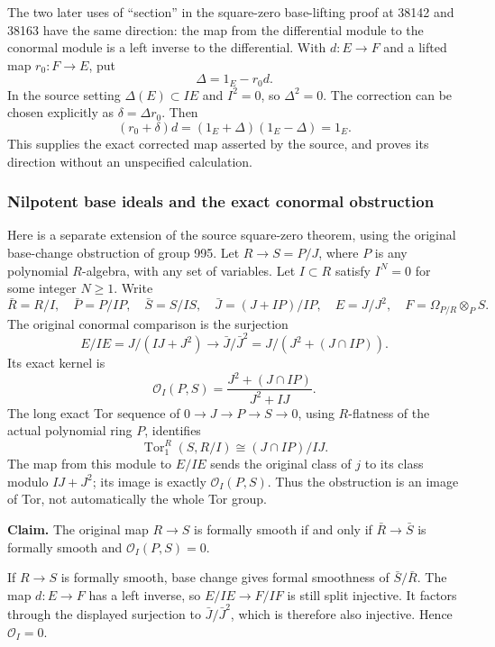 The two later uses of ``section'' in the square-zero base-lifting proof at 38142 and 38163 have the same direction: the map from the differential module to the conormal module is a left inverse to the differential. With \(d:E\to F\) and a lifted map \(r_0:F\to E\), put \[
\Delta=1_E-r_0d.
\] In the source setting \(\Delta(E)\subset IE\) and \(I^2=0\), so \(\Delta^2=0\). The correction can be chosen explicitly as \(\delta=\Delta r_0\). Then \[
(r_0+\delta)d=(1_E+\Delta)(1_E-\Delta)=1_E.
\] This supplies the exact corrected map asserted by the source, and proves its direction without an unspecified calculation.

\subsubsection{Nilpotent base ideals and the exact conormal obstruction}\label{nilpotent-base-ideals-and-the-exact-conormal-obstruction}

Here is a separate extension of the source square-zero theorem, using the original base-change obstruction of group 995. Let \(R\to S=P/J\), where \(P\) is any polynomial \(R\)-algebra, with any set of variables. Let \(I\subset R\) satisfy \(I^N=0\) for some integer \(N\ge1\). Write \[
\bar R=R/I,\quad \bar P=P/IP,\quad \bar S=S/IS,\quad
\bar J=(J+IP)/IP,\quad E=J/J^2,\quad F=\Omega_{P/R}\otimes_PS.
\] The original conormal comparison is the surjection \[
E/IE=J/(IJ+J^2)\longrightarrow
\bar J/\bar J^2=J/(J^2+(J\cap IP)).
\] Its exact kernel is \[
\mathcal O_I(P,S)=\frac{J^2+(J\cap IP)}{J^2+IJ}.
\] The long exact Tor sequence of \(0\to J\to P\to S\to0\), using \(R\)-flatness of the actual polynomial ring \(P\), identifies \[
\operatorname{Tor}_1^R(S,R/I)\cong (J\cap IP)/IJ.
\] The map from this module to \(E/IE\) sends the original class of \(j\) to its class modulo \(IJ+J^2\); its image is exactly \(\mathcal O_I(P,S)\). Thus the obstruction is an image of Tor, not automatically the whole Tor group.

\textbf{Claim.} The original map \(R\to S\) is formally smooth if and only if \(\bar R\to\bar S\) is formally smooth and \(\mathcal O_I(P,S)=0\).

If \(R\to S\) is formally smooth, base change gives formal smoothness of \(\bar S/\bar R\). The map \(d:E\to F\) has a left inverse, so \(E/IE\to F/IF\) is still split injective. It factors through the displayed surjection to \(\bar J/\bar J^2\), which is therefore also injective. Hence \(\mathcal O_I=0\).

